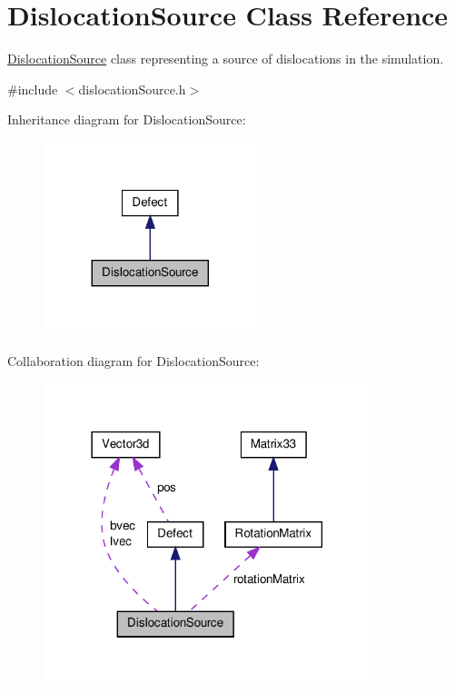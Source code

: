 \hypertarget{classDislocationSource}{\section{\-Dislocation\-Source \-Class \-Reference}
\label{de/de3/classDislocationSource}
}


\hyperlink{classDislocationSource}{\-Dislocation\-Source} class representing a source of dislocations in the simulation.  




{\ttfamily \#include $<$dislocation\-Source.\-h$>$}



\-Inheritance diagram for \-Dislocation\-Source\-:
\nopagebreak
\begin{figure}[H]
\begin{center}
\leavevmode
\includegraphics[width=176pt]{dc/d96/classDislocationSource__inherit__graph}
\end{center}
\end{figure}


\-Collaboration diagram for \-Dislocation\-Source\-:
\nopagebreak
\begin{figure}[H]
\begin{center}
\leavevmode
\includegraphics[width=270pt]{da/d4c/classDislocationSource__coll__graph}
\end{center}
\end{figure}
